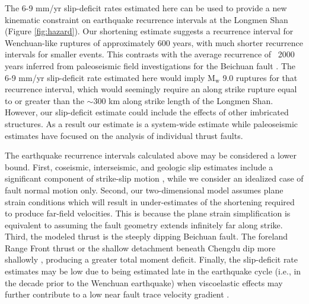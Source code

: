 \documentclass[12pt]{article}
\begin{document}
The 6-9 mm/yr slip-deficit rates estimated here can be used to provide a new kinematic constraint on earthquake recurrence intervals at the Longmen Shan (Figure \ref{fig:hazard}). Our shortening estimate suggests a recurrence interval for Wenchuan-like ruptures of approximately 600 years, with much shorter recurrence intervals for smaller events. This contrasts with the average recurrence of ~2000 years inferred from paleoseismic field investigations for the Beichuan fault \citep{Ran2010}. The 6-9 mm/yr slip-deficit rate estimated here would imply $\textrm{M}_{\textrm{w}}$ 9.0 ruptures for that recurrence interval, which would seemingly require an along strike rupture equal to or greater than the ${\sim}300$ km along strike length of the Longmen Shan. However, our slip-deficit estimate could include the effects of other imbricated structures. As a result our estimate is a system-wide estimate while paleoseismic estimates have focused on the analysis of individual thrust faults. 

The earthquake recurrence intervals calculated above may be considered a lower bound. First, coseismic, interseismic, and geologic slip estimates include a significant component of strike-slip motion \citep{Shen2009a, Qi2011, Densmore2007, Meade2007, Loveless2011}, while we consider an idealized case of fault normal motion only. Second, our two-dimensional model assumes plane strain conditions which will result in under-estimates of the shortening required to produce far-field velocities. This is because the plane strain simplification is equivalent to assuming the fault geometry extends infinitely far along strike. Third, the modeled thrust is the steeply dipping Beichuan fault. The foreland Range Front thrust or the shallow detachment beneath Chengdu dip more shallowly \citep{Hubbard2010}, producing a greater total moment deficit. Finally, the slip-deficit rate estimates may be low due to being estimated late in the earthquake cycle (i.e., in the decade prior to the Wenchuan earthquake) when viscoelastic effects may further contribute to a low near fault trace velocity gradient \citep{savage00}.
\end{document}
